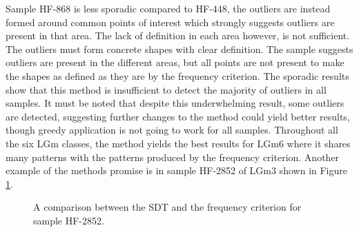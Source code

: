 Sample HF-868 is less sporadic compared to HF-448, the outliers are instead formed around common points of interest which strongly suggests outliers are present in that area. The lack of definition in each area however, is not sufficient. The outliers must form concrete shapes with clear definition. The sample suggests outliers are present in the different areas, but all points are not present to make the shapes as defined as they are by the frequency criterion. 
The sporadic results show that this method is insufficient to detect the majority of outliers in all samples. It must be noted that despite this underwhelming result, some outliers are detected, suggesting further changes to the method could yield better results, though greedy application is not going to work for all samples. Throughout all the six LGm classes, the method yields the best results for LGm6 where it shares many patterns with the patterns produced by the frequency criterion. Another example of the methods promise is in sample HF-2852 of LGm3 shown in Figure \ref{fig:stdHF2852}.

\begin{figure}[H]
    \centering
    \qquad
    \caption{A comparison between the SDT and the frequency criterion for sample HF-2852.
\label{fig:stdHF2852}}%
\end{figure}


